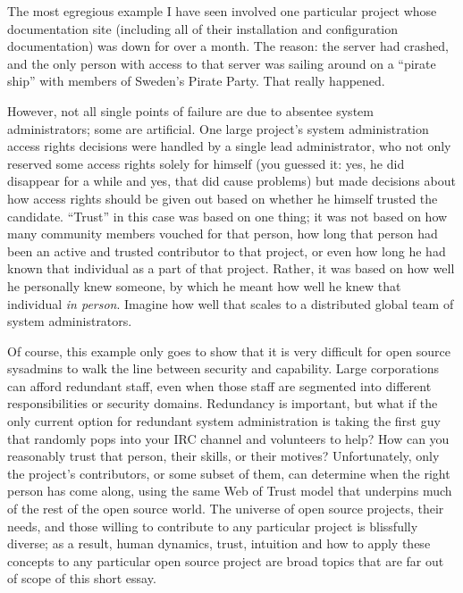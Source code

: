 The most egregious example I have seen involved one particular project whose
documentation site (including all of their installation and configuration
documentation) was down for over a month. The reason: the server had crashed,
and the only person with access to that server was sailing around on a ``pirate
ship'' with members of Sweden’s Pirate Party. That really happened.

However, not all single points of failure are due to absentee system
administrators; some are artificial. One large project’s system administration
access rights decisions were handled by a single lead administrator, who not
only reserved some access rights solely for himself (you guessed it: yes, he did disappear for a
while and yes, that did cause problems) but made decisions about how access
rights should be given out based on whether he himself trusted the candidate.
``Trust'' in this case was based on one thing; it was not based on how many
community members vouched for that person, how long that person had been an
active and trusted contributor to that project, or even how long he had known
that individual as a part of that project. Rather, it was based on how well he
personally knew someone, by which he meant how well he knew that individual \emph{in
person}. Imagine how well that scales to a distributed global team of system
administrators.

Of course, this example only goes to show that it is very difficult for open
source sysadmins to walk the line between security and capability. Large
corporations can afford redundant staff, even when those staff are segmented
into different responsibilities or security domains. Redundancy is important,
but what if the only current option for redundant system administration is
taking the first guy that randomly pops into your IRC channel and volunteers to
help? How can you reasonably trust that person, their skills, or their motives?
Unfortunately, only the project’s contributors, or some subset of them, can
determine when the right person has come along, using the same Web of Trust model
that underpins much of the rest of the open source world. The universe of open source
projects, their needs, and those willing to contribute to any particular project
is blissfully diverse; as a result, human dynamics, trust, intuition and how to
apply these concepts to any particular open source project are broad topics that are far
out of scope of this short essay.

